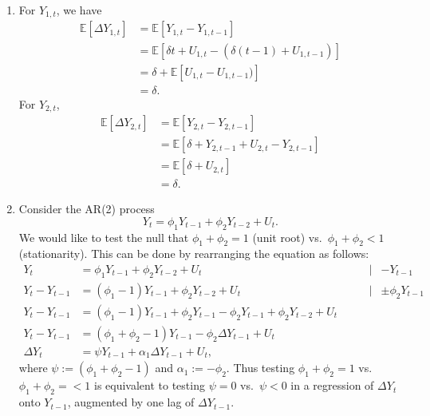 \documentclass[11pt, a4paper]{article}
\newcommand{\E}{\ensuremath{{\mathbb E}}} %
\begin{document}
\begin{enumerate}
\begin{enumerate}
\item
For $Y_{1,t}$, we have
\begin{align*}
\E[\Delta Y_{1,t}]&=\E[Y_{1,t}-Y_{1,t-1}]\\
&=\E[\delta t+U_{1,t}-(\delta (t-1)+U_{1,t-1})]\\
&=\delta +\E[U_{1,t}-U_{1,t-1})]\\
&=\delta.
\end{align*}
For $Y_{2,t}$,
\begin{align*}
\E[\Delta Y_{2,t}]&=\E[Y_{2,t}-Y_{2,t-1}]\\
&=\E[\delta + Y_{2,t-1}+U_{2,t}-Y_{2,t-1}]\\
&=\E[\delta + U_{2,t}]\\
&=\delta.
\end{align*}
\item Consider the AR(2) process
\[
Y_t=\phi_1Y_{t-1}+\phi_2Y_{t-2}+U_t.
\]
We would like to test the null that $\phi_1+\phi_2=1$ (unit root) vs.\ $\phi_1+\phi_2<1$ (stationarity). This can be done by rearranging the equation as follows:
\begin{align*}
Y_t&=\phi_1Y_{t-1}+\phi_2Y_{t-2}+U_t&\mid&-Y_{t-1}\\
Y_t-Y_{t-1}&=(\phi_1-1)Y_{t-1}+\phi_2Y_{t-2}+U_t&\mid&\pm \phi_2Y_{t-1}\\
Y_t-Y_{t-1}&=(\phi_1-1)Y_{t-1}+\phi_2Y_{t-1}-\phi_2Y_{t-1}+\phi_2Y_{t-2}+U_t\qquad&\\
Y_t-Y_{t-1}&=(\phi_1+\phi_2-1)Y_{t-1}-\phi_2\Delta Y_{t-1}+U_t&\\
\Delta Y_t&=\psi Y_{t-1}+\alpha_1\Delta Y_{t-1}+U_t,&
\end{align*}
where $\psi:=(\phi_1+\phi_2-1)$ and $\alpha_1:=-\phi_2$. Thus testing $\phi_1+\phi_2=1$ vs.\ $\phi_1+\phi_2=<1$ is equivalent to testing $\psi=0$ vs.\ $\psi<0$ in a regression of
$\Delta Y_t$ onto $Y_{t-1}$, augmented by one lag of $\Delta Y_{t-1}$.

\end{enumerate}


\end{enumerate}
\end{document}
